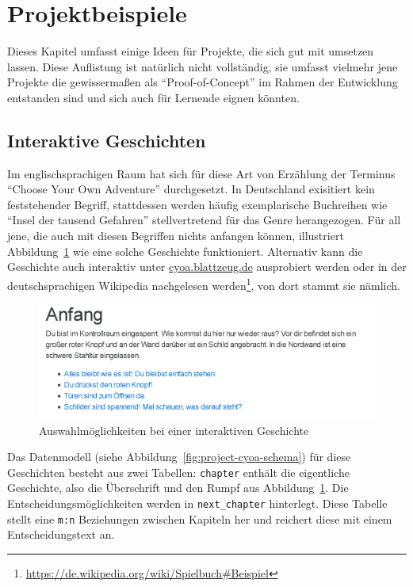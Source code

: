 \section{Projektbeispiele}
\label{sec:project-examples}

Dieses Kapitel umfasst einige Ideen für Projekte, die sich gut mit \idename{} umsetzen lassen. Diese Auflistung ist natürlich nicht vollständig, sie umfasst vielmehr jene Projekte die gewissermaßen als "`Proof-of-Concept"' im Rahmen der Entwicklung entstanden sind und sich auch für Lernende eignen könnten.

\subsection{Interaktive Geschichten}
\label{sec:project-cyoa}

Im englischsprachigen Raum hat sich für diese Art von Erzählung der Terminus ``Choose Your Own Adventure'' durchgesetzt. In Deutschland exisitiert kein feststehender Begriff, stattdessen werden häufig exemplarische Buchreihen wie ``Insel der tausend Gefahren'' stellvertretend für das Genre herangezogen. Für all jene, die auch mit diesen Begriffen nichts anfangen können, illustriert Abbildung~\ref{fig:enduser-cyoa-choice} wie eine solche Geschichte funktioniert. Alternativ kann die Geschichte auch interaktiv unter \href{http://cyoa.blattzeug.de/}{cyoa.blattzeug.de} ausprobiert werden oder in der deutschsprachigen Wikipedia nachgelesen werden\footnote{\url{https://de.wikipedia.org/wiki/Spielbuch\#Beispiel}}, von dort stammt sie nämlich.

\begin{figure}[h]
  \centering \includegraphics[width=\textwidth-2pt,frame]{images/screenshots/20161019/enduser-cyoa-choice.png}
  \caption{Auswahlmöglichkeiten bei einer interaktiven Geschichte}
  \label{fig:enduser-cyoa-choice}
\end{figure}

Das Datenmodell (siehe Abbildung~\ref{fig:project-cyoa-schema}) für diese Geschichten besteht aus zwei Tabellen: \texttt{chapter} enthält die eigentliche Geschichte, also die Überschrift und den Rumpf aus Abbildung~\ref{fig:enduser-cyoa-choice}. Die Entscheidungsmöglichkeiten werden in \texttt{next\_chapter} hinterlegt. Diese Tabelle stellt eine \texttt{m:n} Beziehungen zwischen Kapiteln her und reichert diese mit einem Entscheidungstext an.

